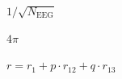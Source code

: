 \documentclass{article}
\begin{document}
$1/\sqrt{N_{\text{EEG}}}$
\pagebreak

$4\pi$
\pagebreak

$ r = r_1 + p \cdot r_{12} + q \cdot r_{13} $
\pagebreak
\end{document}
